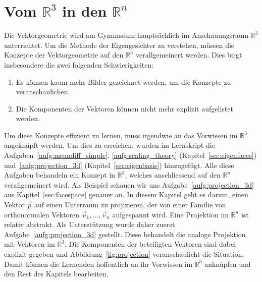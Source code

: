\section{Vom $\mathbb R^3$ in den $\mathbb R^n$}
Die Vektorgeometrie wird am Gymnasium hauptsächlich im Anschauungsraum $\mathbb R^3$ unterrichtet.
Um die Methode der Eigengesichter zu verstehen, müssen die Konzepte der Vektorgeometrie auf den $\mathbb R^n$ verallgemeinert werden.
Dies birgt insbesondere die zwei folgenden Schwierigkeiten:
\begin{enumerate}[label=\arabic*.]
	\item Es können kaum mehr Bilder gezeichnet werden, um die Konzepte zu veranschaulichen.
	\item Die Komponenten der Vektoren können nicht mehr explizit aufgelistet werden.
\end{enumerate}
Um diese Konzepte effizient zu lernen, muss irgendwie an das Vorwissen im $\mathbb R^3$ angeknüpft werden.
Um dies zu erreichen, wurden im Lernskript die Aufgaben~\ref{aufg:meandiff_simple}, \ref{aufg:scaling_theory} (Kapitel~\ref{sec:eigenfaces}) und~\ref{aufg:projection_3d} (Kapitel~\ref{sec:eigenbasis}) hinzugefügt.
Alle diese Aufgaben behandeln ein Konzept in $\mathbb R^3$, welches anschliessend auf den $\mathbb R^n$ verallgemeinert wird.
Als Beispiel schauen wir uns Aufgabe~\ref{aufg:projection_3d} aus Kapitel~\ref{sec:facespace} genauer an.
In diesem Kapitel geht es darum, einen Vektor $\vec{p}$ auf einen Unterraum zu projizieren, der von einer Familie von orthonormalen Vektoren $\vec{v}_1,\ldots,\vec{v}_n$ aufgespannt wird.
Eine Projektion im $\mathbb R^n$ ist relativ abstrakt.
Als Unterstützung wurde daher zuerst Aufgabe~\ref{aufg:projection_3d} gestellt.
Diese behandelt die analoge Projektion mit Vektoren im $\mathbb R^3$.
Die Komponenten der beteiligten Vektoren sind dabei explizit gegeben und Abbildung~\ref{fig:projection} veranschaulicht die Situation.
Damit können die Lernenden hoffentlich an ihr Vorwissen im $\mathbb R^3$ anknüpfen und den Rest des Kapitels bearbeiten.